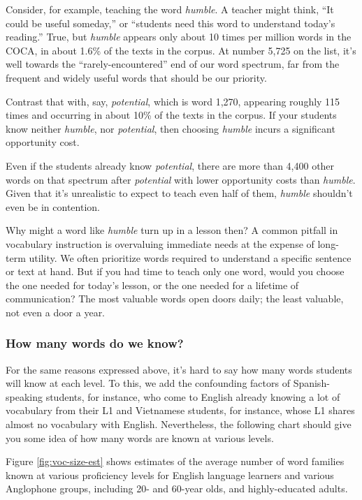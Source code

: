 Consider, for example, teaching the word \textit{humble}. A teacher might think, ``It could be useful someday,'' or ``students need this word to understand today's reading.'' True, but \textit{humble} appears only about 10 times per million words in the COCA, in about 1.6\% of the texts in the corpus. At number 5,725 on the list, it's well towards the ``rarely-encountered'' end of our word spectrum, far from the frequent and widely useful words that should be our priority.

Contrast that with, say, \textit{potential}, which is word 1,270, appearing roughly 115 times and occurring in about 10\% of the texts in the corpus. If your students know neither \textit{humble}, nor \textit{potential}, then choosing \textit{humble} incurs a significant opportunity cost.

Even if the students already know \textit{potential}, there are more than 4,400 other words on that spectrum after \textit{potential} with lower opportunity costs than \textit{humble}. Given that it's unrealistic to expect to teach even half of them, \textit{humble} shouldn't even be in contention.

Why might a word like \textit{humble} turn up in a lesson then? A common pitfall in vocabulary instruction is overvaluing immediate needs at the expense of long-term utility. We often prioritize words required to understand a specific sentence or text at hand. But if you had time to teach only one word, would you choose the one needed for today's lesson, or the one needed for a lifetime of communication? The most valuable words open doors daily; the least valuable, not even a door a year.



\subsubsection*{How many words do we know?}

For the same reasons expressed above, it's hard to say how many words students will know at each level. To this, we add the confounding factors of Spanish-speaking students, for instance, who come to English already knowing a lot of vocabulary from their L1 and Vietnamese students, for instance, whose L1 shares almost no vocabulary with English. Nevertheless, the following chart should give you some idea of how many words are known at various levels.

Figure \ref{fig:voc-size-est} shows estimates of the average number of word families known at various proficiency levels for English language learners and various Anglophone groups, including 20- and 60-year olds, and highly-educated adults.

